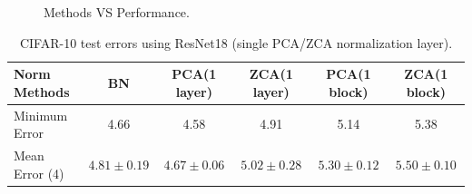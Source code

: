 \documentclass{article}
\begin{document}
\begin{figure}[!htb]
\begin{floatrow}
{%
  \caption{Methods VS Performance.}%
}
\end{floatrow}
\end{figure}


\begin{table}[!htb]
\begin{centering}
\begin{tabular}{|l|c|c|c|c|c|}
\hline
Norm Methods          & BN        & PCA(1 layer)   & ZCA(1 layer)  & PCA(1 block)   & ZCA(1 block) \\ \hline
Minimum Error         & 4.66      &  4.58  &   4.91 &  5.14 &  5.38\\ \hline
Mean Error (4) & $4.81{\pm}0.19$  &  $4.67{\pm}0.06$  & $5.02{\pm}0.28$ & $5.30{\pm}0.12$ & $5.50{\pm}0.10$ \\ \hline
\end{tabular}
\caption{CIFAR-10 test errors using ResNet18 (single PCA/ZCA normalization layer).}
\end{centering}
\end{table}


\medskip
\small


\end{document}
